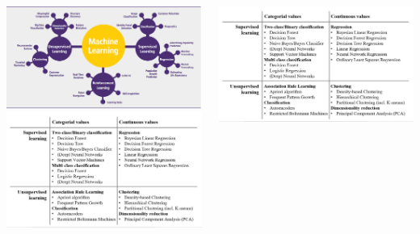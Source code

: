 \documentclass{beamer}
\begin{document}
\begin{frame}[plain]%
\begin{columns}
\begin{column}{0.7\textwidth}
	\includegraphics[scale=0.2]{mlinit}\\
	\includegraphics[scale=0.2]{mlmethods}
\end{column}
\begin{column}{0.3\textwidth}
	\includegraphics[scale=0.2]{mlmethods}
\end{column}
\end{columns}
\end{frame}
\end{document}
